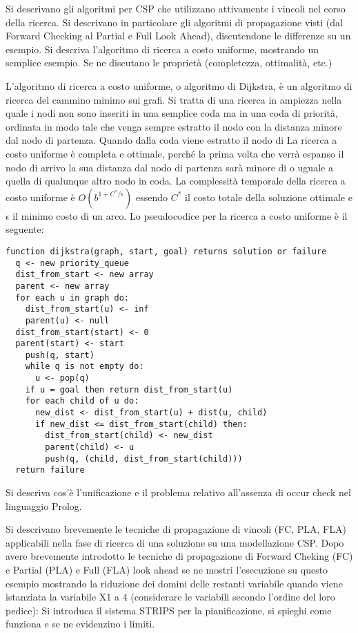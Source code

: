 \documentclass[answers, a4paper, 11pt]{exam}
\begin{document}
\begin{questions}
\question Si descrivano gli algoritmi per CSP che utilizzano attivamente i vincoli nel corso della ricerca. Si
descrivano in particolare gli algoritmi di propagazione visti (dal Forward Checking al Partial e Full
Look Ahead), discutendone le differenze su un esempio.
\question Si descriva l’algoritmo di ricerca a costo uniforme, mostrando un semplice esempio. Se ne discutano le
proprietà (completezza, ottimalità, etc.)
\begin{solution}
	L'algoritmo di ricerca a costo uniforme, o algoritmo di Dijkstra, è un algoritmo di ricerca del cammino minimo sui grafi. 
  Si tratta di una ricerca in ampiezza nella quale i nodi non sono inseriti in una semplice coda ma in una coda di priorità, ordinata in modo tale che venga sempre estratto il nodo con la distanza minore dal nodo di partenza. 
  Quando dalla coda viene estratto il nodo di 
  La ricerca a costo uniforme è completa e ottimale, perché la prima volta che verrà espanso il nodo di arrivo la sua distanza dal nodo di partenza sarà minore di o uguale a quella di qualunque altro nodo in coda. 
  La complessità temporale della ricerca a costo uniforme è $O(b^{1 + C^*/\epsilon})$ essendo $C^*$ il costo totale della soluzione ottimale  e $\epsilon$ il minimo costo di un arco. 
	Lo pseudocodice per la ricerca a costo uniforme è il seguente:
	\begin{verbatim}
function dijkstra(graph, start, goal) returns solution or failure
  q <- new priority_queue
  dist_from_start <- new array
  parent <- new array
  for each u in graph do:
    dist_from_start(u) <- inf
    parent(u) <- null
  dist_from_start(start) <- 0
  parent(start) <- start
	push(q, start)
	while q is not empty do:
	  u <- pop(q)
    if u = goal then return dist_from_start(u)
    for each child of u do:
      new_dist <- dist_from_start(u) + dist(u, child) 
      if new_dist <= dist_from_start(child) then:
        dist_from_start(child) <- new_dist
        parent(child) <- u
        push(q, (child, dist_from_start(child)))
  return failure
	\end{verbatim}
\end{solution}
\question Si descriva cos’è l'unificazione e il problema relativo all’assenza di occur check nel linguaggio Prolog.

\question Si descrivano brevemente le tecniche di propagazione di vincoli (FC, PLA, FLA) applicabili nella fase di
ricerca di una soluzione su una modellazione CSP.
\question Dopo avere brevemente introdotto le tecniche di propagazione di Forward Cheking (FC) e Partial (PLA) e
Full (FLA) look ahead se ne mostri l’esecuzione su questo esempio mostrando la riduzione dei domini delle
restanti variabile quando viene istanziata la variabile X1 a 4 (considerare le variabili secondo l’ordine del
loro pedice):
\question Si introduca il sistema STRIPS per la pianificazione, si spieghi come funziona e se ne evidenzino i limiti.


\end{questions}
\end{document}
